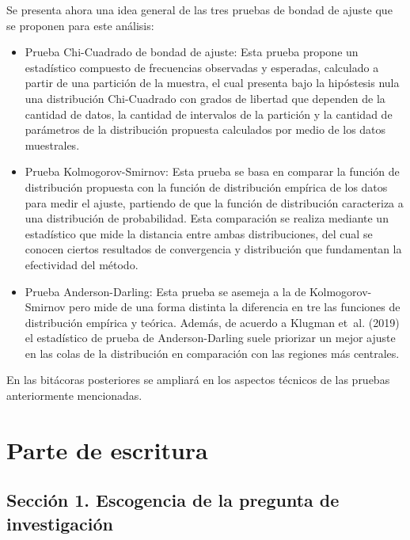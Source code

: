 \documentclass[
  letterpaper,
  onepage,
  openany]{scrreprt}
\begin{document}
Se presenta ahora una idea general de las tres pruebas de bondad de
ajuste que se proponen para este análisis:

\begin{itemize}
\item
  Prueba Chi-Cuadrado de bondad de ajuste: Esta prueba propone un
  estadístico compuesto de frecuencias observadas y esperadas, calculado
  a partir de una partición de la muestra, el cual presenta bajo la
  hipóstesis nula una distribución Chi-Cuadrado con grados de libertad
  que dependen de la cantidad de datos, la cantidad de intervalos de la
  partición y la cantidad de parámetros de la distribución propuesta
  calculados por medio de los datos muestrales.
\item
  Prueba Kolmogorov-Smirnov: Esta prueba se basa en comparar la función
  de distribución propuesta con la función de distribución empírica de
  los datos para medir el ajuste, partiendo de que la función de
  distribución caracteriza a una distribución de probabilidad. Esta
  comparación se realiza mediante un estadístico que mide la distancia
  entre ambas distribuciones, del cual se conocen ciertos resultados de
  convergencia y distribución que fundamentan la efectividad del método.
\item
  Prueba Anderson-Darling: Esta prueba se asemeja a la de
  Kolmogorov-Smirnov pero mide de una forma distinta la diferencia en
  tre las funciones de distribución empírica y teórica. Además, de
  acuerdo a Klugman et~al. (2019) el estadístico de prueba de
  Anderson-Darling suele priorizar un mejor ajuste en las colas de la
  distribución en comparación con las regiones más centrales.
\end{itemize}

En las bitácoras posteriores se ampliará en los aspectos técnicos de las
pruebas anteriormente mencionadas.

\hypertarget{parte-de-escritura}{%
\section{Parte de escritura}\label{parte-de-escritura}}

\hypertarget{secciuxf3n-1.-escogencia-de-la-pregunta-de-investigaciuxf3n}{%
\subsection{Sección 1. Escogencia de la pregunta de
investigación}\label{secciuxf3n-1.-escogencia-de-la-pregunta-de-investigaciuxf3n}}
\end{document}
